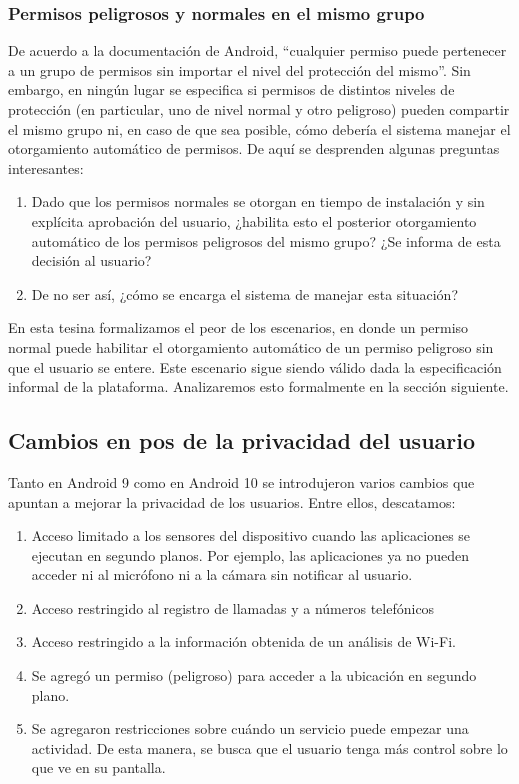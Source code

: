 \subsubsection{Permisos peligrosos y normales en el mismo grupo}
De acuerdo a la documentación de Android, ``cualquier permiso puede pertenecer a un grupo de permisos sin
importar el nivel del protección del mismo''\cite{android-permissions}. Sin embargo, en ningún lugar se
especifica si permisos de distintos niveles de protección (en particular, uno de nivel normal y otro
peligroso) pueden compartir el mismo grupo ni, en caso de que sea posible, cómo debería el sistema
manejar el otorgamiento automático de permisos. De aquí se desprenden algunas preguntas interesantes:
\begin{enumerate}
    \item Dado que los permisos normales se otorgan en tiempo de instalación y sin explícita aprobación
          del usuario, ¿habilita esto el posterior otorgamiento automático de los permisos peligrosos del mismo
          grupo? ¿Se informa de esta decisión al usuario?
    \item De no ser así, ¿cómo se encarga el sistema de manejar esta situación?
\end{enumerate}
En esta tesina formalizamos el peor de los escenarios, en donde un permiso normal puede habilitar el
otorgamiento automático de un permiso peligroso sin que el usuario se entere. Este escenario sigue siendo
válido dada la especificación informal de la plataforma. Analizaremos esto formalmente en la sección
siguiente.


\subsection{Cambios en pos de la privacidad del usuario}
Tanto en Android 9 como en Android 10 se introdujeron varios cambios que apuntan a mejorar la privacidad
de los usuarios. Entre ellos, descatamos:
\begin{enumerate}
    \item Acceso limitado a los sensores del dispositivo cuando las aplicaciones se ejecutan en segundo
          planos. Por ejemplo, las aplicaciones ya no pueden acceder ni al micrófono ni a la cámara sin
          notificar al usuario.
    \item Acceso restringido al registro de llamadas y a números telefónicos
    \item Acceso restringido a la información obtenida de un análisis de Wi-Fi.
    \item Se agregó un permiso (peligroso) para acceder a la ubicación en segundo plano.
    \item Se agregaron restricciones sobre cuándo un servicio puede empezar una actividad. De esta
          manera, se busca que el usuario tenga más control sobre lo que ve en su pantalla.
\end{enumerate}

